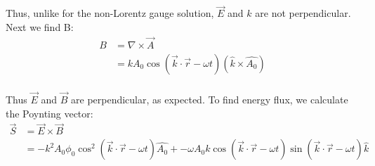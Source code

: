 \documentclass[10pt]{article} %
\begin{document}
Thus, unlike for the non-Lorentz gauge solution, $\vec{E}$ and $k$ are not perpendicular. Next we find B:\\

\begin{align*}
  B &= \nabla \times \vec{A}\\
  &= kA_0\cos(\vec{k}\cdot\vec{r}-\omega t)(\hat{k}\times\hat{A_0})\\
\end{align*}

Thus $\vec{E}$ and $\vec{B}$ are perpendicular, as expected. To find energy flux, we calculate the Poynting vector:\\

\begin{align*}
  \vec{S} &= \vec{E}\times\vec{B}\\
  &= -k^2A_0\phi_0\cos^2(\vec{k}\cdot\vec{r}-\omega t)\hat{A_0} + -\omega A_0k\cos(\vec{k}\cdot\vec{r}-\omega t)\sin(\vec{k}\cdot\vec{r}-\omega t)\hat{k}\\
\end{align*}
\end{document}
